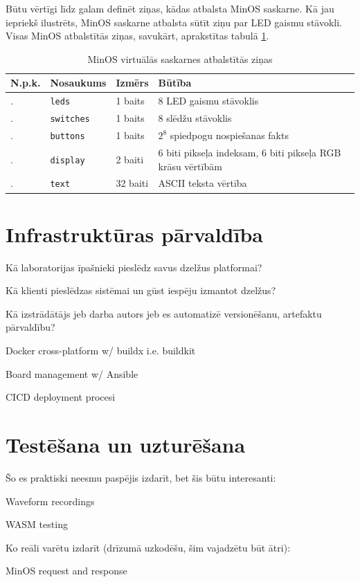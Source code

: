 Būtu vērtīgi līdz galam definēt ziņas, kādas atbalsta MinOS saskarne. Kā jau
iepriekš ilustrēts, MinOS saskarne atbalsta sūtīt ziņu par LED gaismu stāvokli.
Visas MinOS atbalstītās ziņas, savukārt, aprakstītas tabulā \ref{table:minospackets}.

\begin{table}[H]
    \newcommand\rownumber{\stepcounter{minospacketcounter}\arabic{minospacketcounter}.}
    \begin{tabular}{ |p{1cm}|p{3cm}|p{2cm}|p{8cm}| }
    \hline
    N.p.k.&Nosaukums&Izmērs&Būtība \\
    \hline
    \rownumber&\lstinline!leds!&1 baits&8 LED gaismu stāvoklis \\
    \hline
    \rownumber&\lstinline!switches!&1 baits&8 slēdžu stāvoklis \\
    \hline
    \rownumber&\lstinline!buttons!&1 baits&\(2^8\) spiedpogu nospiešanas fakts \\
    \hline
    \rownumber&\lstinline!display!&2 baiti&6 biti pikseļa indeksam, 6 biti pikseļa RGB krāsu vērtībām \\
    \hline
    \rownumber&\lstinline!text!&32 baiti&ASCII teksta vērtība \\
    \hline
    \end{tabular}
    \centering
    \captionsetup{justification=centering}
    \caption{MinOS virtuālās saskarnes atbalstītās ziņas}
    \label{table:minospackets}
\end{table}

\section{Infrastruktūras pārvaldība}
\label{sec:ops}

Kā laboratorijas īpašnieki pieslēdz savus dzelžus platformai?

Kā klienti pieslēdzas sistēmai un gūst iespēju izmantot dzelžus?

Kā izstrādātājs jeb darba autors jeb es automatizē versionēšanu, artefaktu pārvaldību?

Docker cross-platform w/ buildx i.e. buildkit

Board management w/ Ansible

CICD deployment procesi

\section{Testēšana un uzturēšana}
\label{sec:usage}

Šo es praktiski neesmu paspējis izdarīt, bet šis būtu interesanti:

Waveform recordings

WASM testing

Ko reāli varētu izdarīt (drīzumā uzkodēšu, šim vajadzētu būt ātri):

MinOS request and response

